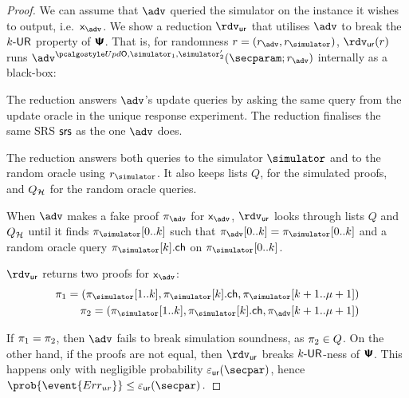 \begin{proof}
	We can assume that $\adv$ queried the simulator on the instance it wishes to
	output, i.e.~$\inp_{\adv}$. We show a reduction $\rdvur$ that utilises $\adv$ to
	break the ${k\text{-}\mathsf{UR}}$ property of $\bm{\mathsf{\Psi}}$. That is, for randomness $r = (r_\adv, \rsim)$,
	$\rdvur (r)$ runs $\advse^{\initU, \simulator_1, \simulator_2'}(\secparam; r_\adv)$ internally as a black-box:
	\begin{compactitem}
		\item The reduction answers $\adv$'s update queries by asking the same query from the
		update oracle in the unique response experiment. The reduction finalises the same
		SRS $\mathsf{srs}$ as the one $\adv$ does.
		\item The reduction answers both queries to the simulator $\simulator$
		and to the random oracle using $\rsim$. It also keeps lists $Q$, for the simulated proofs,
		and $Q_{\mathcal{H}}$ for the random oracle queries.
		\item When $\adv$ makes a fake proof $\zkproof_{\adv}$ for $\inp_{\adv}$, $\rdvur$
		looks through lists $Q$ and $Q_{\mathcal{H}}$ until it finds $\zkproof_{\simulator}[0..k]$
		such that $\zkproof_{\adv}[0..k] = \zkproof_{\simulator}[0..k]$ and a random
		oracle query $\zkproof_{\simulator}[k].\ch$ on $\zkproof_{\simulator}[0..k]$.
		\item $\rdvur$ returns two proofs for $\inp_{\adv}$:
		\begin{align*}
		\zkproof_1 = (\zkproof_{\simulator}[1..k],
		\zkproof_{\simulator}[k].\ch, \zkproof_{\simulator}[k + 1..\mu + 1])\\
		\zkproof_2 = (\zkproof_{\simulator}[1..k],
		\zkproof_{\simulator}[k].\ch, \zkproof_{\adv}[k + 1..\mu + 1])
		\end{align*}
	\end{compactitem}
	If $\pi_1 = \pi_2$, then $\adv$ fails to break simulation soundness, as
	$\pi_2 \in Q$. On the other hand, if the proofs are not equal, then $\rdvur$
	breaks ${k\text{-}\mathsf{UR}}$-ness of $\bm{\mathsf{\Psi}}$. This happens only with negligible probability
	$\epsur(\secpar)$, hence \( \prob{\event{\errur}} \leq \epsur(\secpar)\,. \)
	
\end{proof}
